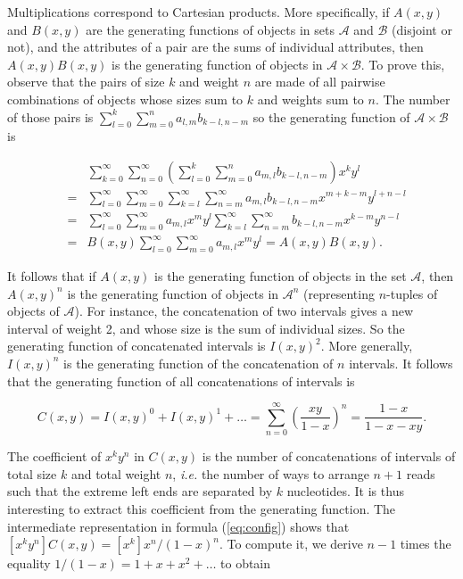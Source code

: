 \documentclass{article}
\begin{document}
Multiplications correspond to Cartesian products. More specifically, if
$A(x,y)$ and $B(x,y)$ are the generating functions of objects in sets
$\mathcal{A}$ and $\mathcal{B}$ (disjoint or not), and the attributes of a
pair are the sums of individual attributes, then $A(x,y)B(x,y)$ is the
generating function of objects in $\mathcal{A} \times \mathcal{B}$. To
prove this, observe that the pairs of size $k$ and weight $n$ are made of
all pairwise combinations of objects whose sizes sum to $k$ and weights
sum to $n$. The number of those pairs is $\sum_{l=0}^k \sum_{m=0}^n
a_{l,m}b_{k-l,n-m}$ so the generating function of $\mathcal{A} \times
\mathcal{B}$ is


\begin{eqnarray*}
&\;& \sum_{k=0}^\infty \sum_{n=0}^\infty \left( \sum_{l=0}^k \sum_{m=0}^n
  a_{m,l}b_{k-l,n-m}\right) x^k y^l  \\ 
&=& \sum_{l=0}^\infty \sum_{m=0}^\infty \sum_{k=l}^\infty \sum_{n=m}^\infty
  a_{m,l}b_{k-l,n-m}x^{m + k-m} y^{l + n-l} \\
&=& \sum_{l=0}^\infty \sum_{m=0}^\infty a_{m,l} x^m y^l
  \sum_{k=l}^\infty \sum_{n=m}^\infty
  b_{k-l,n-m}x^{k-m} y^{n-l} \\
&=& B(x,y) \sum_{l=0}^\infty \sum_{m=0}^\infty a_{m,l} x^m y^l
 = A(x,y)B(x,y).
\end{eqnarray*}

It follows that if $A(x,y)$ is the generating function of objects in the
set $\mathcal{A}$, then $A(x,y)^n$ is the generating function of objects
in $\mathcal{A}^n$ (representing $n$-tuples of objects of $\mathcal{A}$).
For instance, the concatenation of two intervals gives a new interval of
weight 2, and whose size is the sum of individual sizes. So the generating
function of concatenated intervals is $I(x,y)^2$. More generally,
$I(x,y)^n$ is the generating function of the concatenation of $n$
intervals. It follows that the generating function of all concatenations of
intervals is

\begin{equation}
\label{eq:config}
C(x,y) = I(x,y)^0 + I(x,y)^1 +\ldots
= \sum_{n=0}^\infty \left( \frac{xy}{1-x} \right)^n
= \frac{1-x}{1 - x - xy}.
\end{equation}


The coefficient of $x^ky^n$ in $C(x,y)$ is the number of concatenations of
intervals of total size $k$ and total weight $n$, \textit{i.e.} the number
of ways to arrange $n+1$ reads such that the extreme left ends are
separated by $k$ nucleotides. It is thus interesting to extract this
coefficient from the generating function. The intermediate representation
in formula (\ref{eq:config}) shows that $[x^ky^n]C(x,y) = [x^k]
x^n/(1-x)^n$. To compute it, we derive $n-1$ times the equality $1/(1-x) =
1 + x + x^2 + \ldots$ to obtain
\end{document}
